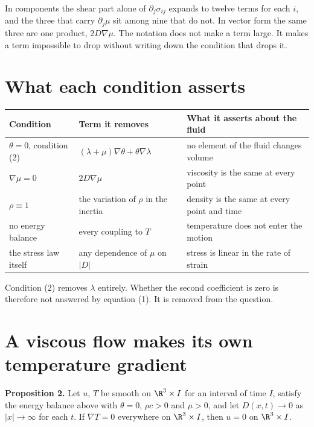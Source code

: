 In components the shear part alone of $\partial_j\sigma_{ij}$ expands to twelve terms for each $i$,
and the three that carry $\partial_j\mu$ sit among nine that do not. In vector form the same three
are one product, $2D\nabla\mu$. The notation does not make a term large. It makes a term impossible
to drop without writing down the condition that drops it.

\section{What each condition asserts}

\begin{center}
\begin{tabular}{@{}p{}p{}p{}@{}}
\toprule
Condition & Term it removes & What it asserts about the fluid \\
\midrule
$\theta = 0$, condition (2) & $(\lambda+\mu)\nabla\theta + \theta\nabla\lambda$
& no element of the fluid changes volume \\[0.5em]
$\nabla\mu = 0$ & $2D\nabla\mu$ & viscosity is the same at every point \\[0.5em]
$\rho \equiv 1$ & the variation of $\rho$ in the inertia
& density is the same at every point and time \\[0.5em]
no energy balance & every coupling to $T$ & temperature does not enter the motion \\[0.5em]
the stress law itself & any dependence of $\mu$ on $|D|$ & stress is linear in the rate of strain \\
\bottomrule
\end{tabular}
\end{center}

Condition (2) removes $\lambda$ entirely. Whether the second coefficient is zero is therefore not
answered by equation (1). It is removed from the question.

\section{A viscous flow makes its own temperature gradient}

\textbf{Proposition 2.} Let $u$, $T$ be smooth on $\R^3\times I$ for an interval of time $I$,
satisfy the energy balance above with $\theta = 0$, $\rho c > 0$ and $\mu > 0$, and let $D(x,t)\to 0$
as $|x|\to\infty$ for each $t$. If $\nabla T = 0$ everywhere on $\R^3\times I$, then $u = 0$ on
$\R^3\times I$.

